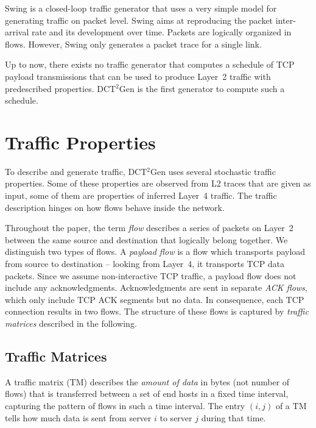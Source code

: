 \documentclass[journal,10pt]{IEEEtran}
\newcommand{\genname}{DCT${^2}$Gen}
\begin{document}
Swing \cite{swing} is a closed-loop traffic generator that uses a very simple model for generating traffic on packet level.
Swing aims at reproducing the packet inter-arrival rate and its development over time. Packets are logically organized in flows.
However, Swing only generates a packet trace for a single link.

Up to now, there exists no traffic generator that computes a schedule of TCP payload transmissions 
that can be used to produce Layer~2 traffic with predescribed properties.
\genname{} is the first generator to compute such a schedule.




\section{Traffic Properties}
\label{sec:traffic}

To describe and generate traffic, \genname{} uses several stochastic traffic properties. Some of these properties are observed from L2 traces that are given as input, some of them are properties of inferred Layer~4 traffic. The traffic description hinges on how flows behave inside the network. 






Throughout the paper, the term \emph{flow} describes a 
series of packets on Layer~2 between the same source and destination that logically belong together. We distinguish two types of flows. 
A \emph{payload flow} is a flow which transports payload from source to destination -- looking from Layer~4, it transports TCP data packets. Since we assume non-interactive TCP traffic, a payload flow does not include any acknowledgments. Acknowledgments are sent in separate \emph{ACK flows}, which only include TCP ACK segments but no data. In consequence, each TCP connection results in two flows. The structure of these flows is captured by \emph{traffic matrices} described in the following.




\subsection{Traffic Matrices}
\label{sec:traffic-matrices}

A traffic matrix (TM) describes the \emph{amount of data} in bytes (not number of flows) that is transferred between a set of end hosts in a fixed time interval, capturing the pattern of flows in such a time interval. The entry $(i,j)$ of a TM tells how much data is sent from server $i$ to server $j$ during that time.
\end{document}
